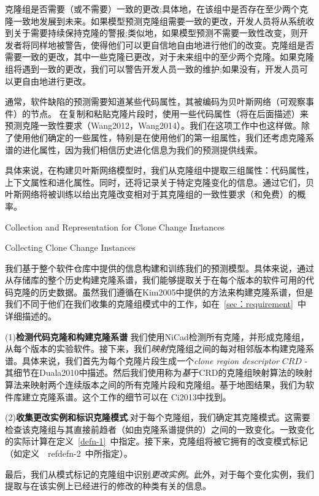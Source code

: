克隆组是否需要（或不需要）一致的更改;具体地，在该组中是否存在至少两个克隆一致地发展到未来。如果模型预测克隆组需要一致的更改，开发人员将从系统收到关于需要持续保持克隆的警报;类似地，如果模型预测不需要一致性改变，则开发者将同样地被警告，使得他们可以更自信地自由地进行他们的改变。{克隆组是否需要一致的更改，其中一些克隆已更改，对于未来组中的至少两个克隆。如果克隆组将遇到一致的更改，我们可以警告开发人员一致的维护;如果没有，开发人员可以更自由地进行更改。}

通常，软件缺陷的预测需要知道某些代码属性，其被编码为贝叶斯网络（可观察事件）的节点。
在复制和粘贴克隆片段时，使用一些代码属性（将在后面描述）来预测克隆一致性要求（Wang2012，Wang2014）。我们在这项工作中也这样做。除了使用他们确定的一些属性，特别是在使用他们的第一组属性，我们还考虑克隆系谱的进化属性，因为我们相信历史进化信息为我们的预测提供线索。

具体来说，在构建贝叶斯网络模型时，我们从克隆组中提取三组属性：代码属性，上下文属性和进化属性。同时，还将记录关于特定克隆变化的信息。通过它们，贝叶斯网络将被训练以给出克隆改变相对于其克隆组的一致性要求（和免费）的概率。

{Collection and Representation for Clone Change Instances}

{Collecting Clone Change Instances} 

我们基于整个软件仓库中提供的信息构建和训练我们的预测模型。具体来说，通过从存储库的整个历史构建克隆系谱，我们能够提取关于在每个版本的软件可用的代码克隆的历史数据。虽然我们遵循在\cite {}{Kim2005}中提供的方法来构建克隆系谱，但是我们不同于他们在我们收集的克隆组模式中的工作，如在~\ref{sec：requirement}~中详细描述的。

(1){\bf 检测代码克隆和构建克隆系谱} 我们使用NiCad检测所有克隆，并形成克隆组，从每个版本的实验软件。接下来，我们{\em 映射}克隆组之间的每对相邻版本构建克隆系谱。具体来说，我们首先为每个克隆片段生成一个{\em clone region descriptor} $ \mathit {CRD} $ - 其细节在\cite {}{Duala2010}中描述。然后我们使用称为{\emph 基于CRD的克隆组映射算法}的映射算法来映射两个连续版本之间的所有克隆片段和克隆组。基于地图结果，我们为软件库建立克隆系谱。这个工作的细节可以在\cite{} {Ci2013}中找到。

(2){\bf 收集更改实例和标识克隆模式}.对于每个克隆组，我们确定其克隆模式。这需要检查该克隆组与其直接前趋者（如由克隆系谱提供的）之间的一致变化。一致变化的实际计算在定义~\ref {defn-1}~中指定。接下来，克隆组将被它拥有的改变模式标记（如定义~\ ref{defn-2}~中所指定）。

最后，我们从模式标记的克隆组中识别{\em 更改实例}。此外，对于每个变化实例，我们提取与在该实例上已经进行的修改的种类有关的信息。

